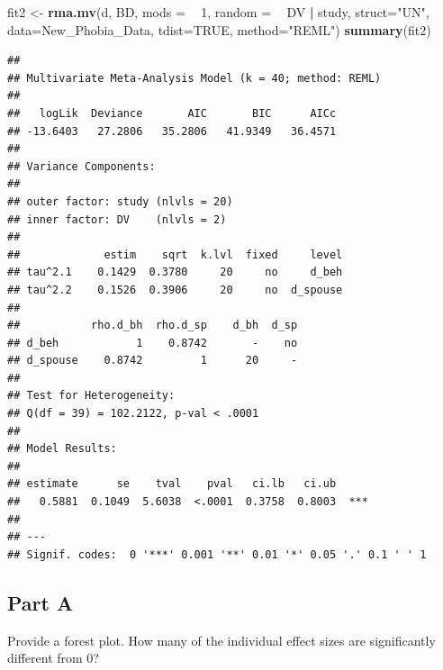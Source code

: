 \documentclass[]{article}
\newenvironment{Shaded}{\begin{snugshade}}{\end{snugshade}}
\newcommand{\KeywordTok}[1]{\textcolor[rgb]{0.13,0.29,0.53}{\textbf{#1}}}
\newcommand{\DataTypeTok}[1]{\textcolor[rgb]{0.13,0.29,0.53}{#1}}
\newcommand{\DecValTok}[1]{\textcolor[rgb]{0.00,0.00,0.81}{#1}}
\newcommand{\StringTok}[1]{\textcolor[rgb]{0.31,0.60,0.02}{#1}}
\newcommand{\OtherTok}[1]{\textcolor[rgb]{0.56,0.35,0.01}{#1}}
\newcommand{\OperatorTok}[1]{\textcolor[rgb]{0.81,0.36,0.00}{\textbf{#1}}}
\newcommand{\NormalTok}[1]{#1}
\begin{document}
\begin{Shaded}
\begin{Highlighting}[]
\NormalTok{fit2 <-}\StringTok{ }\KeywordTok{rma.mv}\NormalTok{(d, BD, }\DataTypeTok{mods =} \OperatorTok{~}\StringTok{ }\DecValTok{1}\NormalTok{, }\DataTypeTok{random =} \OperatorTok{~}\StringTok{ }\NormalTok{DV }\OperatorTok{|}\StringTok{ }\NormalTok{study, }\DataTypeTok{struct=}\StringTok{"UN"}\NormalTok{, }\DataTypeTok{data=}\NormalTok{New_Phobia_Data, }\DataTypeTok{tdist=}\OtherTok{TRUE}\NormalTok{, }\DataTypeTok{method=}\StringTok{"REML"}\NormalTok{)}
\KeywordTok{summary}\NormalTok{(fit2)}
\end{Highlighting}
\end{Shaded}

\begin{verbatim}
## 
## Multivariate Meta-Analysis Model (k = 40; method: REML)
## 
##   logLik  Deviance       AIC       BIC      AICc 
## -13.6403   27.2806   35.2806   41.9349   36.4571   
## 
## Variance Components:
## 
## outer factor: study (nlvls = 20)
## inner factor: DV    (nlvls = 2)
## 
##             estim    sqrt  k.lvl  fixed     level 
## tau^2.1    0.1429  0.3780     20     no     d_beh 
## tau^2.2    0.1526  0.3906     20     no  d_spouse 
## 
##           rho.d_bh  rho.d_sp    d_bh  d_sp 
## d_beh            1    0.8742       -    no 
## d_spouse    0.8742         1      20     - 
## 
## Test for Heterogeneity:
## Q(df = 39) = 102.2122, p-val < .0001
## 
## Model Results:
## 
## estimate      se    tval    pval   ci.lb   ci.ub 
##   0.5881  0.1049  5.6038  <.0001  0.3758  0.8003  *** 
## 
## ---
## Signif. codes:  0 '***' 0.001 '**' 0.01 '*' 0.05 '.' 0.1 ' ' 1
\end{verbatim}

\subsection{Part A}\label{part-a-1}

Provide a forest plot. How many of the individual effect sizes are
significantly different from 0?

\begin{Shaded}
\end{Shaded}
\end{document}
